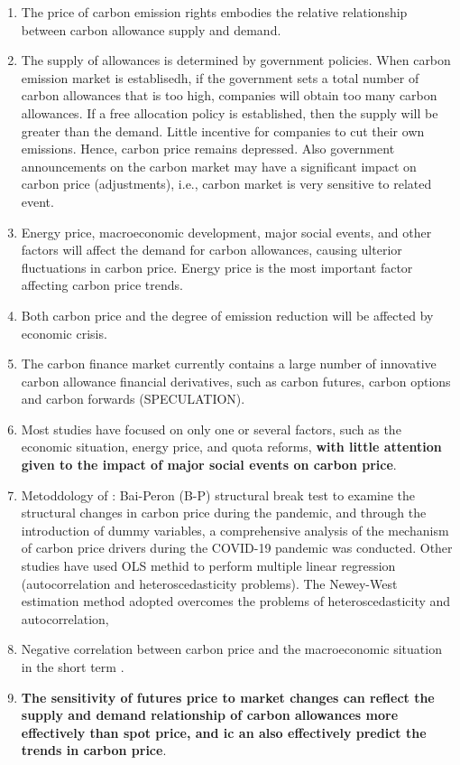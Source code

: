 \begin{enumerate}[wide, itemsep=0cm, topsep=0cm, label=\textbf{\arabic{enumi}.}]
	\item The price of carbon emission rights embodies the relative relationship between carbon allowance supply and demand.
	\item The supply of allowances is determined by government policies. When carbon emission market is establisedh, if the government sets a total number of carbon allowances that is too high, companies will obtain too many carbon allowances. If a free allocation policy is established, then the supply will be greater than the demand. Little incentive for companies to cut their own emissions. Hence, carbon price remains depressed. Also government announcements on the carbon market may have a significant impact on carbon price (adjustments), i.e., carbon market is very sensitive to related event.
	\item Energy price, macroeconomic development, major social events, and other factors will affect the demand for carbon allowances, causing ulterior fluctuations in carbon price. Energy price is the most important factor affecting carbon price trends.
	\item Both carbon price and the degree of emission reduction will be affected by economic crisis.
	\item The carbon finance market currently contains a large number of innovative carbon allowance financial derivatives, such as carbon futures, carbon options and carbon forwards (SPECULATION).
	\item Most studies have focused on only one or several factors, such as the economic situation, energy price, and quota reforms, \textbf{with little attention given to the impact of major social events on carbon price}.
	\item Metoddology of \cite{dong2022exploring}: Bai-Peron (B-P) structural break test to examine the structural changes in carbon price during the pandemic, and through the introduction of dummy variables, a comprehensive analysis of the mechanism of carbon price drivers during the COVID-19 pandemic was conducted. Other studies have used OLS methid to perform multiple linear regression (autocorrelation and heteroscedasticity problems). The Newey-West estimation method adopted overcomes  the problems of heteroscedasticity and autocorrelation,
	\item Negative correlation between carbon price and the macroeconomic situation in the short term \cite{dong2022exploring}.
	\item \textbf{The sensitivity of futures price to market changes can reflect the supply and demand relationship of carbon allowances more effectively than spot price, and ic an also effectively predict the trends in carbon price}.

\end{enumerate}
